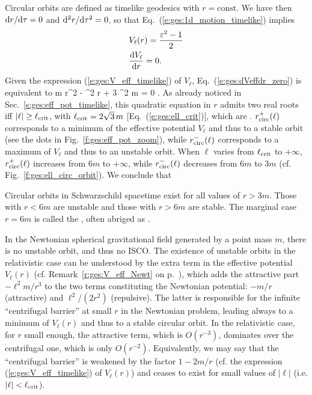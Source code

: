 Circular orbits are defined as timelike geodesics with $r = \mathrm{const}$.
We have then $\mathrm{d} r/\mathrm{d}\tau = 0$ and $\mathrm{d}^2 r/\mathrm{d}\tau^2 = 0$, so that
Eq.~(\ref{e:ges:1d_motion_timelike}) implies
\begin{subequations}
\begin{align}
& V_{\ell}(r) = \frac{\varepsilon^2 - 1}{2} \label{e:ges:Veff_circ} \\
& \frac{\mathrm{d} V_{\ell}}{\mathrm{d} r} = 0 . \label{e:ges:dVeffdr_zero}
\end{align}
\end{subequations}
Given the expression (\ref{e:ges:V_eff_timelike}) of $V_{\ell}$,
Eq.~(\ref{e:ges:dVeffdr_zero}) is equivalent to
\be \label{e:ges:eq_r_ell_circ}
    m r^2 - \ell^2 r + 3 \ell^2 m = 0 .
\ee
As already noticed in Sec.~\ref{s:ges:eff_pot_timelike}, this
quadratic equation in $r$ admits two real roots iff $|\ell| \geq \ell_{\rm crit}$,
with $\ell_{\rm crit} = 2\sqrt{3}\, m$ [Eq.~(\ref{e:ges:ell_crit})],
which are
\be \label{e:ges:r_circ_ell}
    .
\ee
$r_{\rm circ}^+(\ell)$ corresponds to a minimum of the effective potential
$V_{\ell}$ and thus
to a stable orbit (see the dots in Fig.~\ref{f:ges:eff_pot_zoom}),
while $r_{\rm circ}^-(\ell)$ corresponds to a
maximum of $V_{\ell}$ and thus to an unstable orbit.
When $\ell$ varies from $\ell_{\rm crit}$ to $+\infty$,
$r_{\rm circ}^+(\ell)$ increases from $6 m$ to $+\infty$, while
$r_{\rm circ}^-(\ell)$ decreases from $6 m$ to $3 m$ (cf. Fig.~\ref{f:ges:ell_circ_orbit}). We conclude that
\begin{greybox}
Circular orbits in Schwarzschild spacetime exist for all values of $r>3m$.
Those with $r<6m$ are unstable and those with $r>6m$ are stable. The marginal
case $r=6m$ is called the , often abriged as .
\end{greybox}

\begin{remark}
In the Newtonian spherical gravitational field generated by a point mass $m$,
there is no unstable orbit, and thus no ISCO. The existence of unstable orbits
in the relativistic case can be understood by the extra term in
the effective potential $V_{\ell}(r)$ (cf. Remark~\ref{r:ges:V_eff_Newt} on p.~\pageref{r:ges:V_eff_Newt}), which
adds the attractive part $-\ell^2 m/r^3$ to the two
terms constituting the Newtonian potential: $-m/r$ (attractive) and
$\ell^2/(2 r^2)$ (repulsive). The latter is responsible for the infinite ``centrifugal
barrier'' at small $r$ in the Newtonian problem, leading
always to a minimum of $V_\ell(r)$ and thus to a stable circular orbit.
In the relativistic case, for $r$ small enough, the attractive term, which is $O(r^{-3})$, dominates over
the centrifugal one, which is only $O(r^{-2})$.
Equivalently, we may say that the ``centrifugal barrier'' is weakened by the
factor $1-2m/r$ (cf. the expression (\ref{e:ges:V_eff_timelike}) of $V_\ell(r)$)
and ceases to exist for small values of $|\ell|$ (i.e.
$|\ell|<\ell_{\rm crit}$).
\end{remark}

